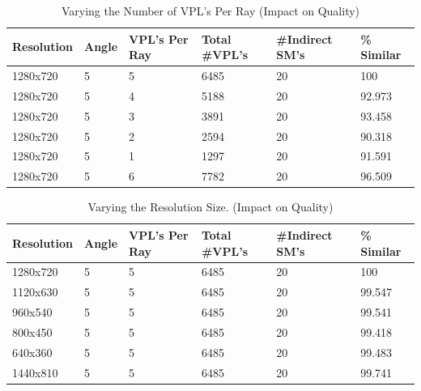 \begin{table}[h!]
	\caption{Varying the Number of VPL's Per Ray (Impact on Quality)}
	\begin{center}
	    \begin{tabular}{ | l | l | l | l | l | l |}
	    \hline
	    Resolution & Angle & VPL's Per Ray & Total \#VPL's & \#Indirect SM's & \% Similar\\ \hline
	    1280x720 & 5 & 5 & 6485 & 20 & 100\\ \hline
	    1280x720 & 5 & 4 & 5188 & 20 & 92.973\\ \hline
	    1280x720 & 5 & 3 & 3891 & 20 & 93.458\\ \hline
	    1280x720 & 5 & 2 & 2594 & 20 & 90.318\\ \hline
	    1280x720 & 5 & 1 & 1297 & 20 & 91.591\\ \hline
	    1280x720 & 5 & 6 & 7782 & 20 & 96.509\\ \hline
	    \end{tabular}
	\end{center}
	\label{table:5.6}
\end{table}
\begin{table}[h!]
	\caption{Varying the Resolution Size. (Impact on Quality)}
	\begin{center}
	    \begin{tabular}{ | l | l | l | l | l | l |}
	    \hline
	    Resolution & Angle & VPL's Per Ray & Total \#VPL's & \#Indirect SM's & \% Similar\\ \hline
	    1280x720 & 5 & 5 & 6485 & 20 & 100\\ \hline
	    1120x630 & 5 & 5 & 6485 & 20 & 99.547\\ \hline
	    960x540 & 5 & 5 & 6485 & 20 & 99.541\\ \hline
	    800x450 & 5 & 5 & 6485 & 20 & 99.418\\ \hline
	    640x360 & 5 & 5 & 6485 & 20 & 99.483\\ \hline
	    1440x810 & 5 & 5 & 6485 & 20 & 99.741\\ \hline
	    \end{tabular}
	\end{center}
	\label{table:5.7}
\end{table}

